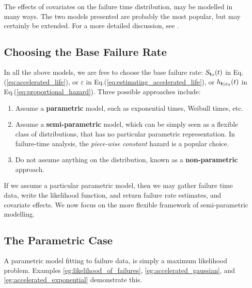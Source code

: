 \begin{extra}
The effects of covariates on the failure time distribution, may be modelled in many ways. 
The two models presented are probably the most popular, but may certainly be extended. 
For a more detailed discussion, see \cite{cox_analysis_1984}.
\end{extra}





\subsection{Choosing the Base Failure Rate}
\label{sec:based-failure-rate}
In all the above models, we are free to choose the base failure rate: 
$S_{\mathbf{t}_0} (t)$ in Eq.(\ref{eq:accelerated_life}), or
$\varepsilon$ in Eq.(\ref{eq:estimating_accelerated_life}), or 
$h_{\mathbf{t}|x_0} (t)$ in Eq.(\ref{eq:proportional_hazard}).
Three possible approaches include:
\begin{enumerate}
\item Assume a \textbf{parametric} model, such as exponential times, Weibull times, etc.
\item Assume a \textbf{semi-parametric} model, which can be simply seen as a flexible class of distributions, that has no particular parametric representation. In failure-time analysis, the \emph{piece-wise constant} hazard is a popular choice.
\item Do not assume anything on the distribution, known as a \textbf{non-parametric} approach. 
\end{enumerate}
If we assume a particular parametric model, then we may gather failure time data, write the likelihood function, and return failure rate estimates, and covariate effects.
We now focus on the more flexible framework of semi-parametric modelling.


\subsection{The Parametric Case}
A parametric model fitting to failure data, is simply a maximum likelihood problem.
Examples \ref{eg:likelihood_of_failures}, \ref{eg:accelerated_gaussian}, and \ref{eg:accelerated_exponential} demonstrate this. 





